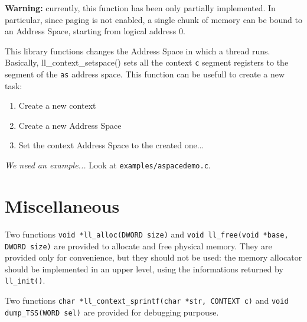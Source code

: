 \documentclass[a4paper]{report}
\begin{document}
{\bf Warning:} currently, this function has been only partially implemented.
In particular, since paging is not enabled, a single chunk of memory can be
bound to an Address Space, starting from logical address 0.


This library functions changes the Address Space in which a thread runs.
Basically, {ll\_context\_setspace()} sets all the context {\tt c} segment
registers to the segment of the {\tt as} address space.
This function can be usefull to create a new task: \begin{enumerate}
\item Create a new context
\item Create a new Address Space
\item Set the context Address Space to the created one...
\end{enumerate}
{\em We need an example...} Look at {\tt examples/aspacedemo.c}.

\section{Miscellaneous}
Two functions {\tt void *ll\_alloc(DWORD size)} and
{\tt void ll\_free(void *base, DWORD size)} are provided to
allocate and free physical memory. They are provided only for
convenience, but they should not be used: the memory allocator
should be implemented in an upper level, using the informations
returned by {\tt ll\_init()}.

Two functions {\tt char *ll\_context\_sprintf(char *str, CONTEXT c)} and
{\tt void dump\_TSS(WORD sel)} are provided for debugging purpouse.
\end{document}
